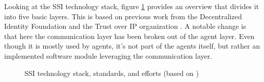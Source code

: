     	Looking at the \ac{SSI} technology stack, figure \ref{figure: ssi_stack_detail} provides an overview that divides it into five basic layers. This is based on previous work from the Decentralized Identity Foundation and the Trust over IP organization \cite{heck_ssi_2020,yildiz_layers_2021,davie_0289_2021}. A notable change is that here the communication layer has been broken out of the agent layer. Even though it is mostly used by agents, it's not part of the agents itself, but rather an implemented software module leveraging the communication layer.
    	
		\begin{figure}[ht]
            \centering
            \caption[\ac{SSI} technology stack, standards, and efforts]{\ac{SSI} technology stack, standards, and efforts (based on \cite{heck_ssi_2020, yildiz_layers_2021,davie_0289_2021})}
            \label{figure: ssi_stack_detail}
        \end{figure}
        

